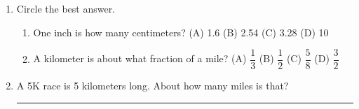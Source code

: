 \documentclass[12pt, twoside]{article}
\newcommand{\blank}[1][2.4cm]{\rule{#1}{0.4pt}}
\begin{document}
\begin{enumerate}[itemsep=0.55cm]
\item Circle the best answer.
  \begin{enumerate}[itemsep=0.5cm]
    \item One inch is how many centimeters? \hfill
      (A) 1.6 \quad\; (B) 2.54 \quad\; (C) 3.28 \quad\; (D) 10
    \item A kilometer is about what fraction of a mile? \hfill
      (A) $\dfrac{1}{3}$ \quad\; (B) $\dfrac{1}{2}$ \quad\;
      (C) $\dfrac{5}{8}$ \quad\; (D) $\dfrac{3}{2}$
  \end{enumerate}

\item A 5K race is 5 kilometers long. About how many miles is that? \hfill \blank

\end{enumerate}
\end{document}
